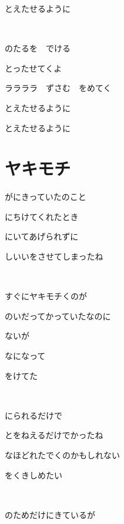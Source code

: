 \documentclass[12pt,a4paper]{article}
\begin{document}
とえたせるように

~

のたるを　でける

とったせてくよ

ララララ　ずさむ　をめてく

とえたせるように

とえたせるように


\section{ヤキモチ}

がにきっていたのこと

にちけてくれたとき

にいてあげられずに

しいいをさせてしまったね

~

すぐにヤキモチくのが

のいだってかっていたなのに

ないが

なになって

をけてた

~

にられるだけで

とをねえるだけでかったね


なほどれたでくのかもしれない

をくきしめたい

~

のためだけにきているが
\end{document}
